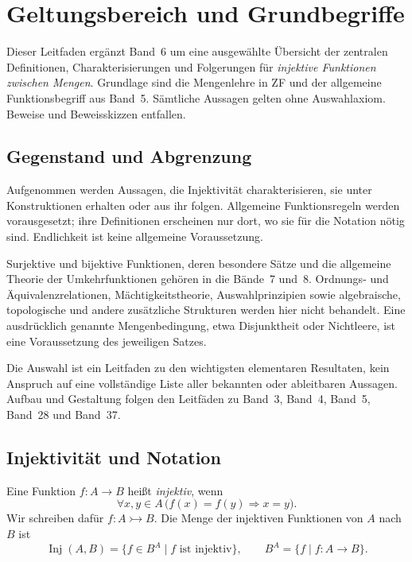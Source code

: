 \chapter{Geltungsbereich und Grundbegriffe}

Dieser Leitfaden ergänzt Band~6 um eine ausgewählte Übersicht der
zentralen Definitionen, Charakterisierungen und Folgerungen für
\emph{injektive Funktionen zwischen Mengen}. Grundlage sind die
Mengenlehre in ZF und der allgemeine Funktionsbegriff aus Band~5.
Sämtliche Aussagen gelten ohne Auswahlaxiom. Beweise und
Beweisskizzen entfallen.

\section{Gegenstand und Abgrenzung}

Aufgenommen werden Aussagen, die Injektivität charakterisieren,
sie unter Konstruktionen erhalten oder aus ihr folgen.
Allgemeine Funktionsregeln werden vorausgesetzt; ihre
Definitionen erscheinen nur dort, wo sie für die Notation nötig sind.
Endlichkeit ist keine allgemeine Voraussetzung.

Surjektive und bijektive Funktionen, deren besondere Sätze und die
allgemeine Theorie der Umkehrfunktionen gehören in die Bände~7 und~8.
Ordnungs- und Äquivalenzrelationen, Mächtigkeitstheorie,
Auswahlprinzipien sowie algebraische, topologische und andere
zusätzliche Strukturen werden hier nicht behandelt.
Eine ausdrücklich genannte Mengenbedingung, etwa Disjunktheit
oder Nichtleere, ist eine Voraussetzung des jeweiligen Satzes.

Die Auswahl ist ein Leitfaden zu den wichtigsten elementaren
Resultaten, kein Anspruch auf eine vollständige Liste aller
bekannten oder ableitbaren Aussagen. Aufbau und Gestaltung folgen
den Leitfäden zu Band~3, Band~4, Band~5, Band~28 und Band~37.

\section{Injektivität und Notation}

\begin{definition}\label{b06guide:def:injection}
Eine Funktion $f\colon A\to B$ heißt \emph{injektiv}, wenn
\[
 \forall x,y\in A\,
       \bigl(f(x)=f(y)\Rightarrow x=y\bigr).
\]
Wir schreiben dafür $f\colon A\rightarrowtail B$.
Die Menge der injektiven Funktionen von $A$ nach $B$ ist
\[
 \operatorname{Inj}(A,B)
   =\{f\in B^A\mid f\text{ ist injektiv}\},
 \qquad B^A=\{f\mid f\colon A\to B\}.
\]
\end{definition}

